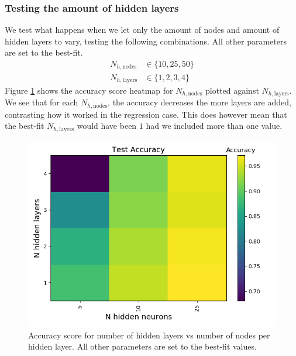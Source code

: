 \documentclass[a4paper]{article}
\newcommand{\Nhn}{N_{h,\text{nodes}}}
\newcommand{\Nhl}{N_{h,\text{layers}}}
\begin{document}
\subsubsection*{Testing the amount of hidden layers}
We test what happens when we let only the amount of nodes and amount of hidden layers to vary, testing the following combinations. All other parameters are set to the best-fit.
\begin{align*}
	\Nhn &\in \{10, 25, 50\}\\
	\Nhl &\in \{1, 2, 3, 4\}
\end{align*}
Figure \ref{fig:nn_params_mnist} shows the accuracy score heatmap for $\Nhn$ plotted against $\Nhl$. We see that for each $\Nhn$, the accuracy decreases the more layers are added, contrasting how it worked in the regression case. This does however mean that the best-fit $\Nhl$ would have been $1$ had we included more than one value.
\begin{figure}[H]
	\centering
	\includegraphics[scale=0.5]{../figures/task_d/nn_parameters/heatmap_nn_parameters_lr_constant_Nhyp111134_Accuracy_nhn_nhl.png}
	\caption{Accuracy score for number of hidden layers vs number of nodes per hidden layer. All other parameters are set to the best-fit values.}
	\label{fig:nn_params_mnist}
\end{figure}
\end{document}
